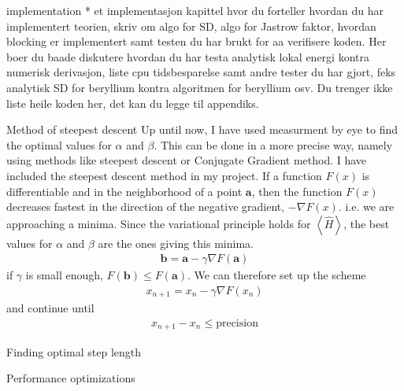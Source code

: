 \documentclass[a4paper, 12pt, titlepage]{article}
\begin{document}
\begin{section}{implementation}
  * et implementasjon kapittel hvor du forteller hvordan du har implementert teorien, skriv om algo for SD, algo for Jastrow faktor, hvordan blocking er implementert samt testen du har brukt for aa verifisere koden. Her boer du baade diskutere hvordan du har testa analytisk lokal energi kontra numerisk derivasjon, liste cpu tidsbesparelse samt andre tester du har gjort, feks analytisk SD for beryllium kontra algoritmen for beryllium osv. Du trenger ikke liste heile koden her, det kan du legge til appendiks. 


  \begin{subsection}{Method of steepest descent}
  	Up until now, I have used measurment by eye to find the optimal values for $\alpha$ and $\beta$. This can be done in a more precise way, namely using methods like steepest descent or Conjugate Gradient method. I have included the steepest descent method in my project.
 If a function $F(x)$ is differentiable and in the neighborhood of a point $\mathbf{a}$, then the function $F(x)$ decreases fastest in the direction of the negative gradient, $-\nabla F(x)$. i.e. we are approaching a minima. Since the variational principle holds for $\left<\hat H\right> $, the best values for $\alpha$ and $\beta$ are the ones giving this minima. 
 \begin{align*}
 	\mathbf{b} = \mathbf{a} - \gamma \nabla F(\mathbf{a}) 
 \end{align*}
 if $\gamma$ is small enough, $F(\mathbf{b}) \leq F(\mathbf{a})$. We can therefore set up the scheme
 \begin{align*}
 	x_{n+1} = x_n - \gamma \nabla F(x_n)
 \end{align*}
 and continue until
 \begin{align*}
 	x_{n+1} - x_n \leq \text{precision}
 \end{align*}
  \end{subsection}


 \begin{subsection}{Finding optimal step length}
 	
 \end{subsection}
	
 \begin{subsection}{Performance optimizations}
  	
 \end{subsection}

\end{section}
\end{document}
